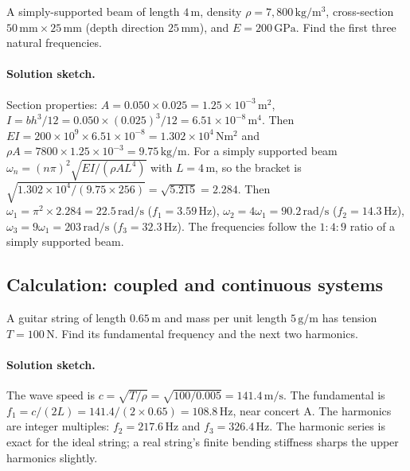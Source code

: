 \begin{exercise}
A simply-supported beam of length $4\,\si{\meter}$, density $\rho =
7{,}800\,\si{\kilogram\per\meter\cubed}$, cross-section $50\,\si{
\milli\meter} \times 25\,\si{\milli\meter}$ (depth direction
$25\,\si{\milli\meter}$), and $E = 200\,\text{GPa}$. Find the first
three natural frequencies.

\paragraph{Solution sketch.} Section properties: $A = 0.050 \times
0.025 = 1.25 \times 10^{-3}\,\si{\meter\squared}$, $I = bh^3/12 =
0.050 \times (0.025)^3/12 = 6.51 \times 10^{-8}\,\si{\meter\tothe{4}}$.
Then $EI = 200 \times 10^9 \times 6.51 \times 10^{-8} = 1.302 \times
10^4\,\si{\newton\meter\squared}$ and $\rho A = 7800 \times 1.25
\times 10^{-3} = 9.75\,\si{\kilogram\per\meter}$. For a simply
supported beam $\omega_n = (n\pi)^2\sqrt{EI/(\rho A L^4)}$ with $L =
4\,\si{\meter}$, so the bracket is $\sqrt{1.302\times 10^4/(9.75
\times 256)} = \sqrt{5.215} = 2.284$. Then $\omega_1 = \pi^2 \times
2.284 = 22.5\,\si{\radian\per\second}$ ($f_1 = 3.59\,\si{\hertz}$),
$\omega_2 = 4\omega_1 = 90.2\,\si{\radian\per\second}$ ($f_2 = 14.3\,
\si{\hertz}$), $\omega_3 = 9\omega_1 = 203\,\si{\radian\per\second}$
($f_3 = 32.3\,\si{\hertz}$). The frequencies follow the $1:4:9$ ratio
of a simply supported beam.
\end{exercise}

\subsection*{Calculation: coupled and continuous systems}

\begin{exercise}
A guitar string of length $0.65\,\si{\meter}$ and mass per unit length
$5\,\si{\gram\per\meter}$ has tension $T = 100\,\text{N}$. Find its
fundamental frequency and the next two harmonics.

\paragraph{Solution sketch.} The wave speed is $c = \sqrt{T/\rho} =
\sqrt{100/0.005} = 141.4\,\si{\meter\per\second}$. The fundamental is
$f_1 = c/(2L) = 141.4/(2 \times 0.65) = 108.8\,\si{\hertz}$, near
concert A. The harmonics are integer multiples: $f_2 = 217.6\,\si{
\hertz}$ and $f_3 = 326.4\,\si{\hertz}$. The harmonic series is exact
for the ideal string; a real string's finite bending stiffness sharps
the upper harmonics slightly.
\end{exercise}

